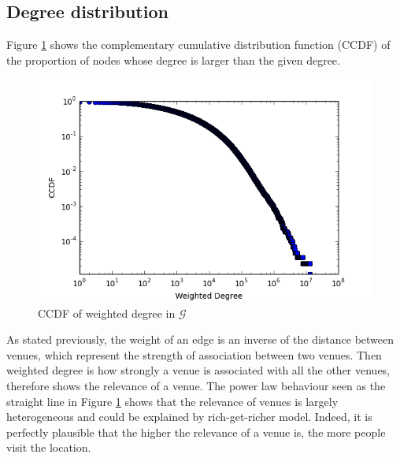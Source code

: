 \subsection{Degree distribution}
Figure \ref{fig:degree-distribution} shows the complementary cumulative distribution function (CCDF) of the proportion of nodes whose degree is larger than the given degree.
\begin{figure}
\centering
\includegraphics[scale=0.5]{../weighted_degree_ccdf.png}
\caption{CCDF of weighted degree in $\mathcal{G}$}
\label{fig:degree-distribution}
\end{figure}
As stated previously, the weight of an edge is an inverse of the distance between venues, which represent the strength of association between two venues. Then weighted degree is how strongly a venue is associated with all the other venues, therefore shows the relevance of a venue. The power law behaviour seen as the straight line in Figure \ref{fig:degree-distribution} shows that the relevance of venues is largely heterogeneous and could be explained by rich-get-richer model. Indeed, it is perfectly plausible that the higher the relevance of a venue is, the more people visit the location.

